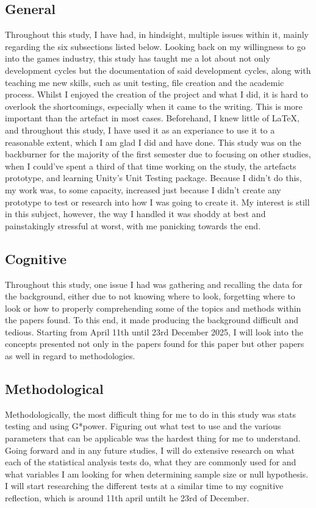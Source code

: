 \documentclass[conference]{IEEEtran}
\begin{document}
\subsection{General}
Throughout this study, I have had, in hindsight, multiple issues within it, mainly regarding the six subsections listed below. Looking back on my willingness to go into the games industry, this study has taught me a lot about not only development cycles but the documentation of said development cycles, along with teaching me new skills, such as unit testing, file creation and the academic process. Whilst I enjoyed the creation of the project and what I did, it is hard to overlook the shortcomings, especially when it came to the writing. This is more important than the artefact in most cases. Beforehand, I knew little of \LaTeX, and throughout this study, I have used it as an experiance to use it to a reasonable extent, which I am glad I did and have done. This study was on the backburner for the majority of the first semester due to focusing on other studies, when I could've spent a third of that time working on the study, the artefacts prototype, and learning Unity's Unit Testing package. Because I didn't do this, my work was, to some capacity, increased just because I didn't create any prototype to test or research into how I was going to create it. My interest is still in this subject, however, the way I handled it was shoddy at best and painstakingly stressful at worst, with me panicking towards the end.

\subsection{Cognitive}
Throughout this study, one issue I had was gathering and recalling the data for the background, either due to not knowing where to look, forgetting where to look or how to properly comprehending some of the topics and methods within the papers found. To this end, it made producing the background difficult and tedious. Starting from April 11th until 23rd December 2025, I will look into the concepts presented not only in the papers found for this paper but other papers as well in regard to methodologies. 

\subsection{Methodological}
Methodologically, the most difficult thing for me to do in this study was stats testing and using G*power. Figuring out what test to use and the various parameters that can be applicable was the hardest thing for me to understand. Going forward and in any future studies, I will do extensive research on what each of the statistical analysis tests do, what they are commonly used for and what variables I am looking for when determining sample size or null hypothesis. I will start researching the different tests at a similar time to my cognitive reflection, which is around 11th april untilt he 23rd of December.
\end{document}
